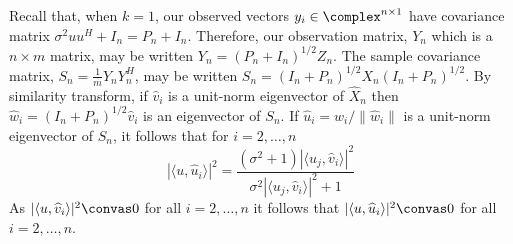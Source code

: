 Recall that, when $k=1$, our observed vectors $y_i\in\complex^{n\times 1}$ have covariance matrix $\sigma^2uu^H+I_n=P_n+I_n$. Therefore, our observation matrix, $Y_n$ which is a $n\times m$ matrix, may be written $Y_n=\left(P_n+I_n\right)^{1/2}Z_n$. The sample covariance matrix, $S_n=\frac{1}{m}Y_nY_n^H$, may be written $S_n=\left(I_n+P_n\right)^{1/2}X_n\left(I_n+P_n\right)^{1/2}$. By similarity transform, if $\widehat{v}_i$ is a unit-norm eigenvector of $\widehat{X}_n$ then $\widehat{w}_i=\left(I_n+P_n\right)^{1/2}\widehat{v}_i$ is an eigenvector of $S_n$. If $\widehat{u}_i=\widehat{w}_i/\|\widehat{w}_i\|$ is a unit-norm eigenvector of $S_n$, it follows that for $i=2,\dots,n$
\begin{equation*}
|\langle u,\widehat{u}_i\rangle|^2=\frac{\left(\sigma^2+1\right)|\langle u_j,\widehat{v}_i\rangle|^2}{\sigma^2|\langle u_j,\widehat{v}_i\rangle|^2+1}
\end{equation*}
As $|\langle u,\widehat{v}_i\rangle|^2\convas 0$ for all $i=2,\dots,n$ it follows that $|\langle u,\widehat{u}_i\rangle|^2\convas 0$ for all $i=2,\dots,n$.


